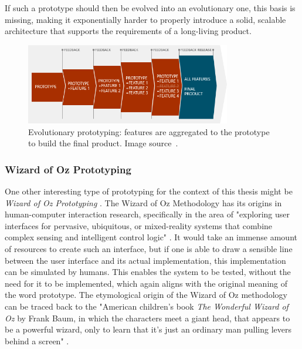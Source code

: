 If such a prototype should then be evolved into an evolutionary one, this basis is missing, making it exponentially harder to properly introduce a solid, scalable architecture that supports the requirements of a long-living product.
%
\begin{figure}[h]
\centering
\includegraphics[width=0.8\textwidth]{images/evolutionary-prototyping.png}
\caption{Evolutionary prototyping: features are aggregated to the prototype to build the final product. Image source~\cite{mourzenko_answer_2014}.}
\label{fig:evolutionary-prototyping}
\end{figure}

\subsubsection{Wizard of Oz Prototyping}
\label{subsub:wizard-of-oz-prototyping}
One other interesting type of prototyping for the context of this thesis might be \emph{Wizard of Oz Prototyping} \cite{dow_wizard_2005}.
The Wizard of Oz Methodology has its origins in human-computer interaction research, specifically in the area of "exploring user interfaces for pervasive, ubiquitous,
or mixed-reality systems that combine complex sensing and intelligent control logic" \cite{dow_wizard_2005}.
It would take an immense amount of resources to create such an interface, but if one is able to draw a sensible line between the user interface and its actual implementation, this implementation can be simulated by humans.
This enables the system to be tested, without the need for it to be implemented, which again aligns with the original meaning of the word prototype.
The etymological origin of the Wizard of Oz methodology can be traced back to the "American children's book \emph{The Wonderful Wizard of Oz} by Frank Baum, in which the characters meet a giant head, that appears to be a powerful wizard, only to learn that it’s just an ordinary man pulling levers behind a screen" \cite{ramaswamy_wizard_2022}.



